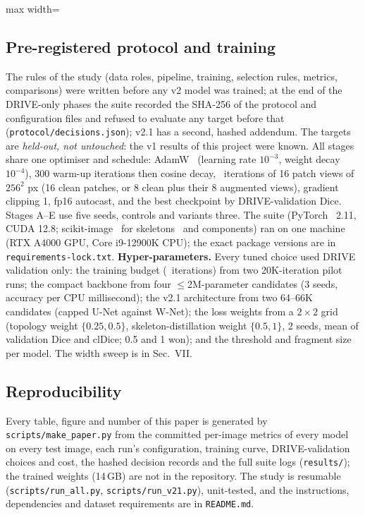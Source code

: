 \documentclass[conference]{IEEEtran}
\begin{document}
\begin{table}[t]
\centering
\caption{Datasets (statistics measured on the files used). Calibre: mean vessel width in pixels, native $\to$ after FOV normalisation; Green: mean$\pm$std inside the FOV.}
\label{tab:data}
\footnotesize
\setlength{\tabcolsep}{2.5pt}
\begin{adjustbox}{max width=\columnwidth}\end{adjustbox}
\end{table}

\subsection{Pre-registered protocol and training}
The rules of the study (data roles, pipeline, training, selection rules, metrics, comparisons) were written before any v2 model was trained; at the end of the DRIVE-only phases the suite recorded the SHA-256 of the protocol and configuration files and refused to evaluate any target before that (\texttt{protocol/decisions.json}); v2.1 has a second, hashed addendum. The targets are \emph{held-out, not untouched}: the v1 results of this project were known. All stages share one optimiser and schedule: AdamW~\cite{loshchilov2019} (learning rate $10^{-3}$, weight decay $10^{-4}$), 300 warm-up iterations then cosine decay, \budgetIters\ iterations of 16 patch views of $256^2$ px (16 clean patches, or 8 clean plus their 8 augmented views), gradient clipping 1, fp16 autocast, and the best checkpoint by DRIVE-validation Dice. Stages A--E use five seeds, controls and variants three. The suite (PyTorch~\cite{paszke2019} 2.11, CUDA 12.8; scikit-image~\cite{vanderwalt2014} for skeletons~\cite{zhang1984} and components) ran on one machine (RTX A4000 GPU, Core i9-12900K CPU); the exact package versions are in \texttt{requirements-lock.txt}. \textbf{Hyper-parameters.} Every tuned choice used DRIVE validation only: the training budget (\budgetIters\ iterations) from two 20K-iteration pilot runs; the compact backbone from four $\le$2M-parameter candidates (3 seeds, accuracy per CPU millisecond); the v2.1 architecture from two 64--66K candidates (capped U-Net against W-Net); the loss weights from a $2{\times}2$ grid (topology weight $\{0.25,0.5\}$, skeleton-distillation weight $\{0.5,1\}$, 2 seeds, mean of validation Dice and clDice; 0.5 and 1 won); and the threshold and fragment size per model. The width sweep is in Sec.~VII.

\subsection{Reproducibility}
Every table, figure and number of this paper is generated by \texttt{scripts/make\_paper.py} from the committed per-image metrics of every model on every test image, each run's configuration, training curve, DRIVE-validation choices and cost, the hashed decision records and the full suite logs (\texttt{results/}); the trained weights (14\,GB) are not in the repository. The study is resumable (\texttt{scripts/run\_all.py}, \texttt{scripts/run\_v21.py}), unit-tested, and the instructions, dependencies and dataset requirements are in \texttt{README.md}.
\end{document}
